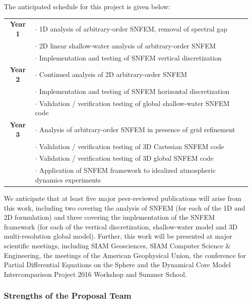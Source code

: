 \documentclass[11pt]{article}
\begin{document}
The anticipated schedule for this project is given below:

\begin{tabularx}{\textwidth}{cX}
\hline
\textbf{Year 1} & $\cdot$ 1D analysis of arbitrary-order SNFEM, removal of spectral gap \\
& $\cdot$ 2D linear shallow-water analysis of arbitrary-order SNFEM \\
& $\cdot$ Implementation and testing of SNFEM vertical discretization \\
\hline
\textbf{Year 2} & $\cdot$ Continued analysis of 2D arbitrary-order SNFEM \\
& $\cdot$ Implementation and testing of SNFEM horizontal discretization \\
& $\cdot$ Validation / verification testing of global shallow-water SNFEM code \\
\hline
\textbf{Year 3} & $\cdot$ Analysis of arbitrary-order SNFEM in presence of grid refinement \\
& $\cdot$ Validation / verification testing of 3D Cartesian SNFEM code \\
& $\cdot$ Validation / verification testing of 3D global SNFEM code \\
& $\cdot$ Application of SNFEM framework to idealized atmospheric dynamics experiments \\
\hline
\end{tabularx}

We anticipate that at least five major peer-reviewed publications will arise from this work, including two covering the analysis of SNFEM (for each of the 1D and 2D formulation) and three covering the implementation of the SNFEM framework (for each of the vertical discretization, shallow-water model and 3D multi-resolution global model). Further, this work will be presented at major scientific meetings, including SIAM Geosciences, SIAM Computer Science \& Engineering, the meetings of the American Geophysical Union, the conference for Partial Differential Equations on the Sphere and the Dynamical Core Model Intercomparison Project 2016 Workshop and Summer School.

\subsubsection{Strengths of the Proposal Team}
\end{document}
